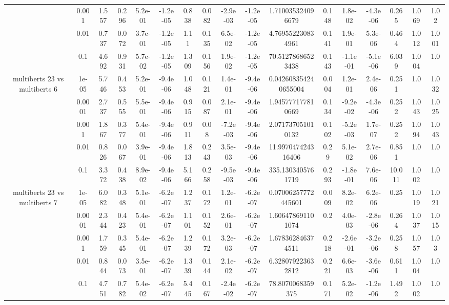 \begin{tabular}{|c|c|c|c|c|c|c|c|c|c|c|c|c|c|c|c|c|}
 & 0.001 & 1.557 & 0.296 & 5.2e-01 & -1.2e-05 & 0.838 & 0.082 & -2.9e-03 & -1.2e-05 & 1.710035324096679 & 0.148 & 1.8e-02 & -4.3e-06 & 0.265 & 1.069 & 1.02 \\
 & 0.01 & 0.737 & 0.072 & 3.7e-01 & -1.2e-05 & 1.11 & 0.135 & 6.5e-02 & -1.2e-05 & 4.769552230834961 & 0.141 & 1.9e-01 & 5.3e-06 & 0.464 & 1.012 & 1.001 \\
 & 0.1 & 4.692 & 0.931 & 5.7e-02 & -1.2e-05 & 1.309 & 0.156 & 1.9e-02 & -1.2e-05 & 70.51278686523438 & 0.143 & -1.1e-01 & -5.1e-06 & 6.039 & 1.004 & 1.0 \\
\hline
\multirow{5}{*}{multiberts 23 vs multiberts 6} & 1e-05 & 5.746 & 0.453 & 5.2e-01 & -9.4e-06 & 1.048 & 0.121 & 1.4e-01 & -9.4e-06 & 0.042608354240655004 & 0.004 & 1.2e-01 & 2.4e-06 & 0.251 & 1.0 & 1.032 \\
 & 0.0001 & 2.737 & 0.555 & 5.5e-01 & -9.4e-06 & 0.915 & 0.087 & 2.1e-01 & -9.4e-06 & 1.945777177810669 & 0.134 & -9.2e-02 & -4.3e-06 & 0.252 & 1.043 & 1.025 \\
 & 0.001 & 1.867 & 0.377 & 5.4e-01 & -9.4e-06 & 0.911 & 0.08 & -7.2e-03 & -9.4e-06 & 2.071737051010132 & 0.102 & -5.2e-03 & 1.7e-07 & 0.252 & 1.094 & 1.043 \\
 & 0.01 & 0.826 & 0.067 & 3.9e-01 & -9.4e-06 & 1.813 & 0.243 & 3.5e-03 & -9.4e-06 & 11.997047424316406 & 0.29 & 5.1e-02 & 2.7e-06 & 0.851 & 1.0 & 1.0 \\
 & 0.1 & 3.372 & 0.438 & 8.9e-02 & -9.4e-06 & 5.166 & 0.258 & -9.5e-03 & -9.4e-06 & 335.1303405761719 & 0.293 & -1.8e-01 & 7.6e-06 & 10.011 & 1.002 & 1.0 \\
\hline
\multirow{5}{*}{multiberts 23 vs multiberts 7} & 1e-05 & 6.082 & 0.348 & 5.1e-01 & -6.2e-07 & 1.237 & 0.172 & 1.2e-01 & -6.2e-07 & 0.07006257772445601 & 0.009 & 8.2e-02 & 6.2e-06 & 0.25 & 1.019 & 1.021 \\
 & 0.0001 & 2.344 & 0.423 & 5.4e-01 & -6.2e-07 & 1.101 & 0.152 & 2.6e-01 & -6.2e-07 & 1.606478691101074 & 0.2 & 4.0e-03 & -2.8e-06 & 0.264 & 1.037 & 1.015 \\
 & 0.001 & 1.759 & 0.345 & 5.4e-01 & -6.2e-07 & 1.239 & 0.172 & 3.2e-03 & -6.2e-07 & 1.678362846374511 & 0.218 & -2.6e-01 & -3.2e-06 & 0.258 & 1.057 & 1.03 \\
 & 0.01 & 0.844 & 0.073 & 3.5e-01 & -6.2e-07 & 1.339 & 0.144 & 2.1e-02 & -6.2e-07 & 6.328079223632812 & 0.221 & 6.6e-03 & -3.6e-06 & 0.611 & 1.004 & 1.0 \\
 & 0.1 & 4.751 & 0.782 & 5.4e-02 & -6.2e-07 & 5.445 & 0.167 & -2.4e-02 & -6.2e-07 & 78.8070068359375 & 0.171 & 5.2e-02 & -1.2e-06 & 1.492 & 1.002 & 1.0 \\

\end{tabular}
